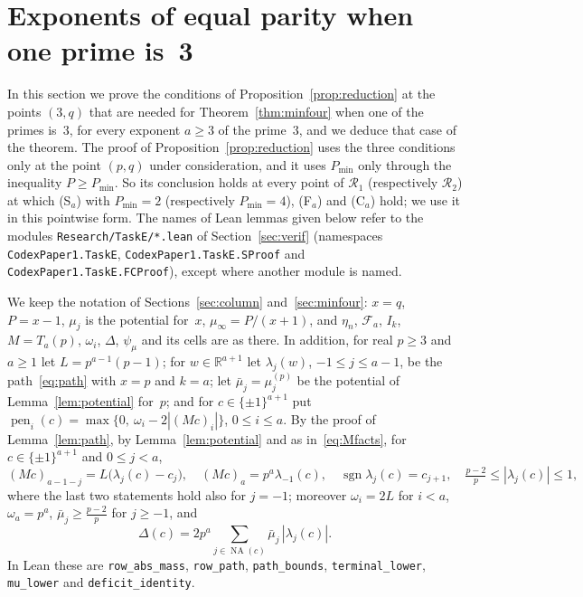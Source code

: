 \documentclass[11pt]{article}
\theoremstyle{remark}
\newcommand{\NA}{\operatorname{NA}}
\begin{document}
\section{Exponents of equal parity when one prime is~3}\label{sec:three}
In this section we prove the conditions of Proposition~\ref{prop:reduction} at the
points $(3,q)$ that are needed for Theorem~\ref{thm:minfour} when one of the primes
is~$3$, for every exponent $a\ge3$ of the prime~$3$, and we deduce that case of the
theorem. The proof of Proposition~\ref{prop:reduction} uses the three conditions
only at the point $(p,q)$ under consideration, and it uses $P_{\min}$ only through
the inequality $P\ge P_{\min}$. So its conclusion holds at every point of
$\mathcal R_1$ (respectively $\mathcal R_2$) at which (S$_a$) with $P_{\min}=2$
(respectively $P_{\min}=4$), (F$_a$) and (C$_a$) hold; we use it in this pointwise
form. The names of Lean lemmas given below refer to the modules
\texttt{Research/TaskE/*.lean} of Section~\ref{sec:verif} (namespaces
\texttt{CodexPaper1.TaskE}, \texttt{CodexPaper1.TaskE.SProof} and \texttt{CodexPaper1.TaskE.FCProof}), except
where another module is named.

We keep the notation of Sections~\ref{sec:column} and~\ref{sec:minfour}: $x=q$,
$P=x-1$, $\mu_j$ is the potential for~$x$, $\mu_\infty=P/(x+1)$, and $\eta_n$,
$\mathcal F_a$, $I_k$, $M=T_a(p)$, $\omega_i$, $\Delta$, $\psi_\mu$ and its cells
are as there. In addition, for real $p\ge3$ and $a\ge1$ let $L=p^{a-1}(p-1)$; for
$w\in\mathbb R^{a+1}$ let $\lambda_j(w)$, $-1\le j\le a-1$, be the
path~\eqref{eq:path} with $x=p$ and $k=a$; let $\bar\mu_j=\mu^{(p)}_j$ be the
potential of Lemma~\ref{lem:potential} for~$p$; and for $c\in\{\pm1\}^{a+1}$ put
$\operatorname{pen}_i(c)=\max\{0,\ \omega_i-2|(Mc)_i|\}$, $0\le i\le a$. By the
proof of Lemma~\ref{lem:path}, by Lemma~\ref{lem:potential} and as
in~\eqref{eq:Mfacts}, for $c\in\{\pm1\}^{a+1}$ and $0\le j<a$,
\begin{equation}\label{eq:lamfacts}
(Mc)_{a-1-j}=L\bigl(\lambda_j(c)-c_j\bigr),\quad (Mc)_a=p^a\lambda_{-1}(c),\quad
\operatorname{sgn}\lambda_j(c)=c_{j+1},\quad \tfrac{p-2}{p}\le|\lambda_j(c)|\le1,
\end{equation}
where the last two statements hold also for $j=-1$; moreover $\omega_i=2L$ for
$i<a$, $\omega_a=p^a$, $\bar\mu_j\ge\frac{p-2}p$ for $j\ge-1$, and
\begin{equation}\label{eq:Deltaid}
\Delta(c)=2p^a\sum_{j\in\NA(c)}\bar\mu_j\,|\lambda_j(c)|.
\end{equation}
In Lean these are \texttt{row\_abs\_mass}, \texttt{row\_path},
\texttt{path\_bounds}, \texttt{terminal\_lower}, \texttt{mu\_lower} and
\texttt{deficit\_identity}.
\end{document}
